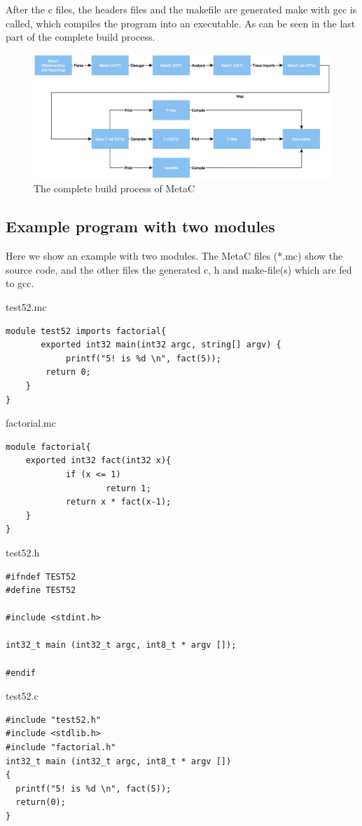 \documentclass[a4paper,10pt,titlepage]{report}
\begin{document}
After the c files, the headers files and the makefile are generated make with gcc is called, which compiles the program into an executable. As can be seen in the last part of the complete build process.

\begin{figure}[ht!]

\centering
\includegraphics[width=\linewidth]{pics/compilation_complete.eps}
\caption{The complete build process of MetaC}
\label{fig:compilation_complete}
\end{figure}

\subsection{Example program with two modules}
Here we show an example with two modules. The MetaC files (*.mc) show the source code, and the other files the generated c, h and make-file(s) which are fed to gcc.

test52.mc
\begin{lstlisting}
module test52 imports factorial{
       exported int32 main(int32 argc, string[] argv) {
         	printf("5! is %d \n", fact(5));
   	   	return 0;
   	}
}
\end{lstlisting}

factorial.mc
\begin{lstlisting}
module factorial{
   	exported int32 fact(int32 x){
         	if (x <= 1)
                	return 1;
         	return x * fact(x-1);
   	}
}
\end{lstlisting}

test52.h
\begin{lstlisting}
#ifndef TEST52
#define TEST52
 
#include <stdint.h>
 
int32_t main (int32_t argc, int8_t * argv []);
 
#endif
\end{lstlisting}

test52.c
\begin{lstlisting}
#include "test52.h"
#include <stdlib.h>
#include "factorial.h"
int32_t main (int32_t argc, int8_t * argv [])
{
  printf("5! is %d \n", fact(5));
  return(0);
}
\end{lstlisting}
\end{document}
